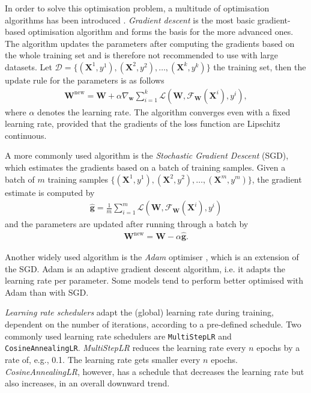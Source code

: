 In order to solve this optimisation problem, a multitude of optimisation algorithms has been introduced \cite{goodfellow_deep_2016}. \textit{Gradient descent} is the most basic gradient-based optimisation algorithm and forms the basis for the more advanced ones. The algorithm updates the parameters after computing the gradients based on the whole training set and is therefore not recommended to use with large datasets. Let $\mathcal{D} = \{(\mathbf{X}^1, y^1), (\mathbf{X}^2, y^2), \dots, (\mathbf{X}^k, y^k)\}$ the training set, then the update rule for the parameters is as follows
\begin{align}
    \mathbf{W}^{\mathrm{new}} = \mathbf{W} + \alpha \nabla_{\mathbf{w}} \sum_{i=1}^k \mathcal{L}(\mathbf{W},\mathcal{F}_{\mathbf{W}}(\mathbf{X}^i), y^i),
\end{align}
where $\alpha$ denotes the learning rate. The algorithm converges even with a fixed learning rate, provided that the gradients of the loss function are Lipschitz continuous.

A more commonly used algorithm is the \textit{Stochastic Gradient Descent} (SGD), which estimates the gradients based on a batch of training samples. Given a batch of $m$ training samples $\{(\mathbf{X}^1, y^1), (\mathbf{X}^2, y^2), \dots, (\mathbf{X}^m, y^m)\}$, the gradient estimate is computed by
\begin{align}
    \hat{\mathbf{g}} = \frac{1}{m} \sum_{i=1}^m \mathcal{L}(\mathbf{W},\mathcal{F}_{\mathbf{W}}(\mathbf{X}^i), y^i)
\end{align}
and the parameters are updated after running through a batch by
\begin{align}
    \mathbf{W}^{\mathrm{new}} = \mathbf{W} - \alpha \hat{\mathbf{g}}.
\end{align}

Another widely used algorithm is the \textit{Adam} optimiser \cite{kingma_adam_2015}, which is an extension of the SGD. Adam is an adaptive gradient descent algorithm, i.e. it adapts the learning rate per parameter. Some models tend to perform better optimised with Adam than with SGD.

\textit{Learning rate schedulers} adapt the (global) learning rate during training, dependent on the number of iterations, according to a pre-defined schedule. Two commonly used learning rate schedulers are \texttt{MultiStepLR} and \texttt{CosineAnnealingLR}. \textit{MultiStepLR} reduces the learning rate every $n$ epochs by a rate of, e.g., 0.1. The learning rate gets smaller every $n$ epochs. \textit{CosineAnnealingLR}, however, has a schedule that decreases the learning rate but also increases, in an overall downward trend.

